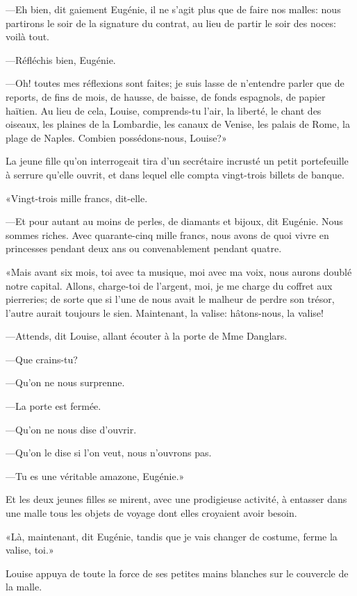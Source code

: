 —Eh bien, dit gaiement Eugénie, il ne s'agit plus que de faire nos malles: nous partirons le soir de la signature du contrat, au lieu de partir le soir des noces: voilà tout. 

—Réfléchis bien, Eugénie. 

—Oh! toutes mes réflexions sont faites; je suis lasse de n'entendre parler que de reports, de fins de mois, de hausse, de baisse, de fonds espagnols, de papier haïtien. Au lieu de cela, Louise, comprends-tu l'air, la liberté, le chant des oiseaux, les plaines de la Lombardie, les canaux de Venise, les palais de Rome, la plage de Naples. Combien possédons-nous, Louise?» 

La jeune fille qu'on interrogeait tira d'un secrétaire incrusté un petit portefeuille à serrure qu'elle ouvrit, et dans lequel elle compta vingt-trois billets de banque. 

«Vingt-trois mille francs, dit-elle. 

—Et pour autant au moins de perles, de diamants et bijoux, dit Eugénie. Nous sommes riches. Avec quarante-cinq mille francs, nous avons de quoi vivre en princesses pendant deux ans ou convenablement pendant quatre. 

«Mais avant six mois, toi avec ta musique, moi avec ma voix, nous aurons doublé notre capital. Allons, charge-toi de l'argent, moi, je me charge du coffret aux pierreries; de sorte que si l'une de nous avait le malheur de perdre son trésor, l'autre aurait toujours le sien. Maintenant, la valise: hâtons-nous, la valise! 

—Attends, dit Louise, allant écouter à la porte de Mme Danglars. 

—Que crains-tu? 

—Qu'on ne nous surprenne. 

—La porte est fermée. 

—Qu'on ne nous dise d'ouvrir. 

—Qu'on le dise si l'on veut, nous n'ouvrons pas. 

—Tu es une véritable amazone, Eugénie.» 

Et les deux jeunes filles se mirent, avec une prodigieuse activité, à entasser dans une malle tous les objets de voyage dont elles croyaient avoir besoin. 

«Là, maintenant, dit Eugénie, tandis que je vais changer de costume, ferme la valise, toi.» 

Louise appuya de toute la force de ses petites mains blanches sur le couvercle de la malle. 

